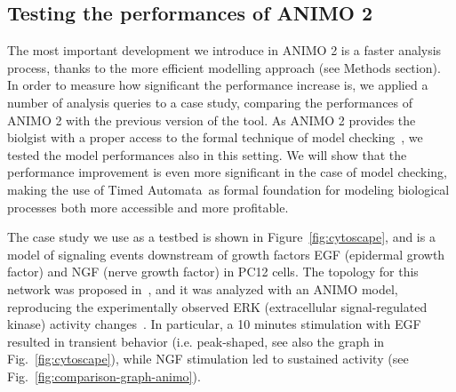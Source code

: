\documentclass{bmcart}
\def\tas{Timed Automata}
\def\animo2{ANIMO 2}
\begin{document}
\subsection*{Testing the performances of \animo2{}}\label{subsec:model-checking}
The most important development we introduce in \animo2{} is a faster analysis process,
thanks to the more efficient modelling approach (see Methods section).
In order to measure how significant the performance increase is, we applied a number of
analysis queries to a case study, comparing the performances of \animo2{} with
the previous version of the tool. As \animo2{} provides the biolgist with
a proper access to the formal technique of model checking~\cite{model-checking},
we tested the model performances also in this setting. We will show that the
performance improvement is even more significant in the case of model checking, making the use of \tas\
as formal foundation for modeling biological processes both more accessible and more profitable.

The case study we use as a testbed is shown in Figure~\ref{fig:cytoscape},
and is a model of signaling events downstream of growth factors EGF (epidermal growth factor)
and NGF (nerve growth factor) in PC12 cells.
The topology for this network was proposed in~\cite{egf-ngf}, and it was analyzed
with an ANIMO model, reproducing the experimentally 
observed ERK (extracellular signal-regulated kinase) activity changes~\cite{animo-bibe}.
In particular, a 10 minutes stimulation with EGF resulted in transient behavior (i.e. peak-shaped,
see also the graph in Fig.~\ref{fig:cytoscape}), while NGF stimulation led to sustained activity (see Fig.~\ref{fig:comparison-graph-animo}).
\end{document}
